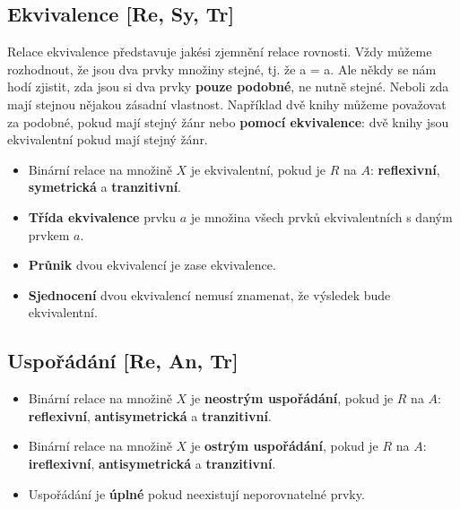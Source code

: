 \subsection{Ekvivalence [Re, Sy, Tr]}
Relace ekvivalence představuje jakési zjemnění relace rovnosti. Vždy můžeme rozhodnout, že jsou dva prvky množiny stejné, tj. že a = a. Ale někdy se nám hodí zjistit, zda jsou si dva prvky \textbf{pouze podobné}, ne nutně stejné. Neboli zda mají stejnou nějakou zásadní vlastnost. Například dvě knihy můžeme považovat za podobné, pokud mají stejný žánr nebo \textbf{pomocí ekvivalence}: dvě knihy jsou ekvivalentní pokud mají stejný žánr.

\begin{itemize}
    \item Binární relace na množině $ X $ je ekvivalentní, pokud je $ R $ na $A$: \textbf{reflexivní}, \textbf{symetrická} a \textbf{tranzitivní}.
    \item \textbf{Třída ekvivalence} prvku $ a $ je množina všech prvků ekvivalentních s daným prvkem $ a $.
    \item \textbf{Průnik} dvou ekvivalencí je zase ekvivalence.
    \item \textbf{Sjednocení} dvou ekvivalencí nemusí znamenat, že výsledek bude ekvivalentní.
\end{itemize}

\subsection{Uspořádání [Re, An, Tr]}
\begin{itemize}
    \item Binární relace na množině $ X $ je \textbf{neostrým uspořádání}, pokud je $ R $ na $A$: \textbf{reflexivní}, \textbf{antisymetrická} a \textbf{tranzitivní}.
    \item Binární relace na množině $ X $ je \textbf{ostrým uspořádání}, pokud je $ R $ na $A$: \textbf{ireflexivní}, \textbf{antisymetrická} a \textbf{tranzitivní}.
    \item Uspořádání je \textbf{úplné} pokud neexistují neporovnatelné prvky.
\end{itemize}